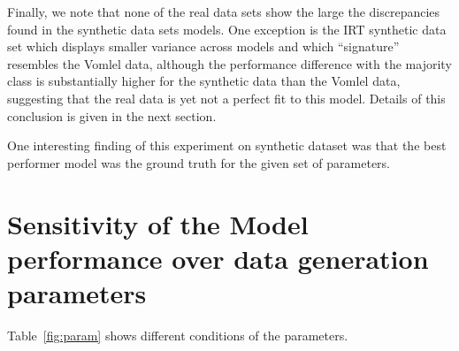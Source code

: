 Finally, we note that none of the real data sets show the large the discrepancies found in the synthetic data sets models. One exception is the IRT synthetic data set which displays smaller variance across models and which ``signature'' resembles the Vomlel data, although the performance difference with the majority class is substantially higher for the synthetic data than the Vomlel data, suggesting that the real data is yet not a perfect fit to this model. Details of this conclusion is given in the next section.


One interesting finding of this experiment on synthetic dataset was that the best performer model was the ground truth for the given set of parameters.

\section{Sensitivity of the Model performance over data generation parameters}
\label{Sensitive}



Table~\ref{fig:param} shows different conditions of the parameters.


